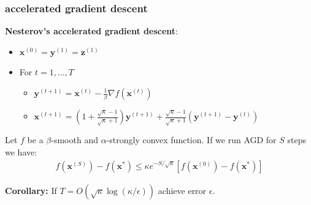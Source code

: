 \documentclass[compress]{beamer}
\newcommand{\bv}[1]{\mathbf{#1}}
\newcommand{\R}{\mathbb{R}}
\begin{document}
\begin{frame}
	\frametitle{accelerated gradient descent}
	\textbf{Nesterov's accelerated gradient descent}:
	\begin{itemize}
		\item $\bv{x}^{(0)} = \bv{y}^{(1)} = \bv{z}^{(1)}$  
		\item For $t = 1,\ldots, T$
		\begin{itemize}
			\item $\bv{y}^{(t+1)} = \bv{x}^{(t)} - \frac{1}{\beta}\nabla f(\bv{x}^{(t)})$
			\item $\bv{x}^{(t+1)} = \left(1 + \frac{\sqrt{\kappa} - 1}{\sqrt{\kappa} + 1}\right) \bv{y}^{(t+1)} + \frac{\sqrt{\kappa} - 1}{\sqrt{\kappa} + 1}\left(\bv{y}^{(t+1)} - \bv{y}^{(t)}\right)$
		\end{itemize}
	\end{itemize}
	\begin{theorem}
		Let $f$ be a $\beta$-smooth and $\alpha$-strongly convex function. If we run AGD for $S$ steps we have:
		\begin{align*}
			f(\bv{x}^{(S)}) - f(\bv{x}^*) \leq \kappa e^{-S/\sqrt{\kappa}} \left[f(\bv{x}^{(0)}) - f(\bv{x}^*) \right]
		\end{align*} 
	\end{theorem}	
	\textbf{Corollary:} If \alert{$T = O\left(\sqrt{\kappa}\log(\kappa/\epsilon)\right)$ achieve error $\epsilon$.} 
	
\end{frame}
%
%		
%		
%		
%
\end{document}
